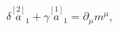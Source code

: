 \begin{equation}
\delta \stackrel{[2]}{a}_{1}+\gamma \stackrel{[1]}{a}_{1}=\partial _{\mu
}m^{\mu },  \label{bf66}
\end{equation}

